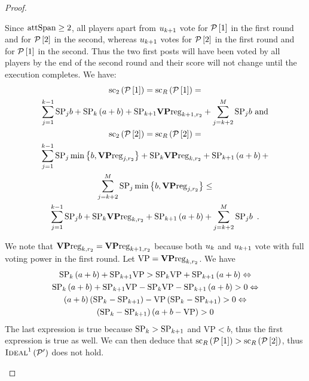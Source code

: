 \begin{proof}
\begin{itemize}
    Since $\mathrm{attSpan} \geq 2$, all players apart from $u_{k + 1}$ vote for
    $\mathcal{P}\left[1\right]$ in the first round and for
    $\mathcal{P}\left[2\right]$ in the second, whereas $u_{k + 1}$ votes for
    $\mathcal{P}\left[2\right]$ in the first round and for
    $\mathcal{P}\left[1\right]$ in the second. Thus the two first posts will have
    been voted by all players by the end of the second round and their score
    will not change until the execution completes. We have:
    \begin{gather*}
      \mathrm{sc}_2\left(\mathcal{P}\left[1\right]\right) =
      \mathrm{sc}_R\left(\mathcal{P}\left[1\right]\right) = \\
      \sum\limits_{j = 1}^{k-1}\mathrm{SP}_j b + \mathrm{SP}_k \left(a + b\right) +
      \mathrm{SP}_{k+1} \mathrm{\textbf{VP}reg}_{k+1,r_2} + \sum\limits_{j = k +
      2}^{M}\mathrm{SP}_j b \text{ and} \\
      \mathrm{sc}_2\left(\mathcal{P}\left[2\right]\right) =
      \mathrm{sc}_R\left(\mathcal{P}\left[2\right]\right) = \\
      \sum\limits_{j = 1}^{k-1}\mathrm{SP}_j \min{\left\{b, \mathrm{\textbf{VP}reg}_{j,
      r_2}\right\}} + \mathrm{SP}_k \mathrm{\textbf{VP}reg}_{k, r_2} + \mathrm{SP}_{k+1} \left(a +
      b\right) + \\
      \sum\limits_{j = k + 2}^{M}\mathrm{SP}_j \min{\left\{b,
      \mathrm{\textbf{VP}reg}_{j, r_2}\right\}} \leq \\
      \sum\limits_{j = 1}^{k-1}\mathrm{SP}_j b + \mathrm{SP}_k \mathrm{\textbf{VP}reg}_{k, r_2} +
      \mathrm{SP}_{k+1} \left(a + b\right) +
      \sum\limits_{j = k + 2}^{M}\mathrm{SP}_j b \enspace.
    \end{gather*}

    We note that $\mathrm{\textbf{VP}reg}_{k, r_2} = \mathrm{\textbf{VP}reg}_{k+1, r_2}$ because
    both $u_k$ and $u_{k+1}$ vote with full voting power in the
    first round. Let $\mathrm{VP} = \mathrm{\textbf{VP}reg}_{k, r_2}$. We have
    \begin{gather*}
      \mathrm{SP}_k \left(a + b\right) + \mathrm{SP}_{k+1} \mathrm{VP} > \mathrm{SP}_k
      \mathrm{VP} + \mathrm{SP}_{k+1} \left(a + b\right) \Leftrightarrow \\
      \mathrm{SP}_k \left(a + b\right) + \mathrm{SP}_{k+1} \mathrm{VP} - \mathrm{SP}_k
      \mathrm{VP} - \mathrm{SP}_{k+1} \left(a + b\right) > 0 \Leftrightarrow \\
      \left(a + b\right) \left(\mathrm{SP}_k - \mathrm{SP}_{k+1}\right) - \mathrm{VP}
      \left(\mathrm{SP}_k - \mathrm{SP}_{k+1}\right) > 0 \Leftrightarrow \\
      \left(\mathrm{SP}_k - \mathrm{SP}_{k+1}\right) \left(a + b - \mathrm{VP}\right) > 0
    \end{gather*}
    The last expression is true because $\mathrm{SP}_k > \mathrm{SP}_{k+1}$ and
    $\mathrm{VP} < b$, thus the first expression is true as well. We can then
    deduce that $\mathrm{sc}_R\left(\mathcal{P}\left[1\right]\right) >
    \mathrm{sc}_R\left(\mathcal{P}\left[2\right]\right)$, thus
    $\textsc{Ideal}^1\left(\mathcal{P}'\right)$ does not hold.


\end{itemize}
\end{proof}
